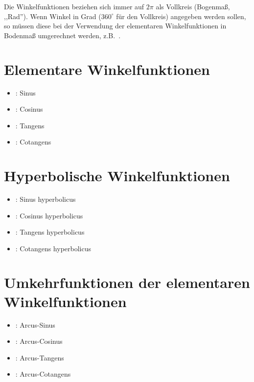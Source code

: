 Die Winkelfunktionen beziehen sich immer auf $2\pi$ als Vollkreis (Bogenmaß, ,,Rad'').
Wenn Winkel in Grad ($360^\circ$ für den Vollkreis) angegeben werden sollen, so müssen
diese bei der Verwendung der elementaren Winkelfunktionen in Bodenmaß umgerechnet werden,
z.B.\ .



\section{Elementare Winkelfunktionen}

\begin{itemize}

\item
{}:
Sinus

\item
{}:
Cosinus

\item
{}:
Tangens

\item
{}:
Cotangens

\end{itemize}



\section{Hyperbolische Winkelfunktionen}

\begin{itemize}

\item
{}:
Sinus hyperbolicus

\item
{}:
Cosinus hyperbolicus

\item
{}:
Tangens hyperbolicus

\item
{}:
Cotangens hyperbolicus

\end{itemize}



\section{Umkehrfunktionen der elementaren Winkelfunktionen}

\begin{itemize}

\item
{}:
Arcus-Sinus

\item
{}:
Arcus-Cosinus

\item
{}:
Arcus-Tangens

\item
{}:
Arcus-Cotangens

\end{itemize}



